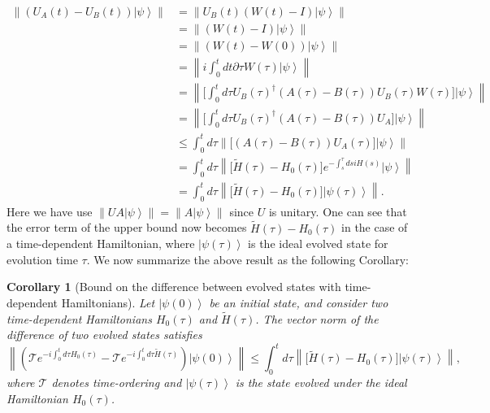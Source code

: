 \documentclass[12pt]{article}
\newtheorem{corollary}{Corollary}
\newcommand{\ket}[1]{\left|#1\right\rangle}
\newcommand{\norm}[1]{\left\lVert #1\right\rVert}
\begin{document}
\begin{equation}
\begin{split}
        \norm{(U_A(t)-U_B(t))\ket{\psi}}&=\norm{U_B(t)( W(t)-I)\ket{\psi}}\\
       &=\norm{( W(t)-I)\ket{\psi}}\\
       &=\norm{( W(t)- W(0))\ket{\psi}}\\
        &=\norm{i\int^t_0 dt  \partial \tau W(\tau)\ket{\psi}}\\
        &= \norm{\big[\int_0 ^t d\tau U_B (\tau)^\dagger (A(\tau)-B(\tau))U_B(\tau) W(\tau) \big]\ket{\psi}}\\
           &= \norm{\big[\int_0 ^t d\tau U_B (\tau)^\dagger (A(\tau)-B(\tau))U_A \big]\ket{\psi}}\\
        &\le \int_0 ^t d\tau\norm{\big[  (A(\tau)-B(\tau))U_A(\tau)\big]\ket{\psi}}\\
        &=\int_0 ^t d\tau \norm{\big[  \widetilde{H}(\tau)-H_0(\tau)\big]e^{-\int_s^{\tau} d siH(s)}\ket{\psi}}\\
        &=\int_0 ^t d\tau \norm{\big[  \widetilde{H}(\tau)-H_0(\tau)\big]\ket{\psi(\tau)}}.
        \end{split}
\end{equation}
Here we have use $\norm{U A\ket{\psi }}=\norm{ A\ket{\psi }}$ since $U$ is unitary.
One can see that the error term of the upper bound now becomes $\widetilde{H}(\tau)-H_0(\tau)$ in the case of a time-dependent Hamiltonian, where $\ket{\psi(\tau)}$ is the ideal evolved state for evolution time $\tau$. We now summarize the above result as the following Corollary:

\begin{corollary} [Bound on the difference between evolved states with time-dependent Hamiltonians]
Let $\ket{\psi(0)}$ be an initial state, and consider two time-dependent Hamiltonians $H_0(\tau)$ and $\widetilde{H}(\tau)$. The vector norm of the difference of two evolved states satisfies 
    \begin{equation}
        \norm{ (\mathcal{T}e^{-i\int_{0}^{t}d{\tau}H_0(\tau)}   -\mathcal{T}e^{-i\int_{0}^{t}d{\tau}\widetilde{H}(\tau)}) \ket{\psi(0)} } \le \int_0 ^t d\tau \norm{\big[  \widetilde{H}(\tau)-H_0(\tau)\big]\ket{\psi(\tau)}},
    \end{equation}
    where $\mathcal{T}$ denotes time-ordering and  $\ket{\psi(\tau)}$ is the state evolved under the ideal Hamiltonian $H_0(\tau)$. \label{Cor:bound}
\end{corollary}
\end{document}
